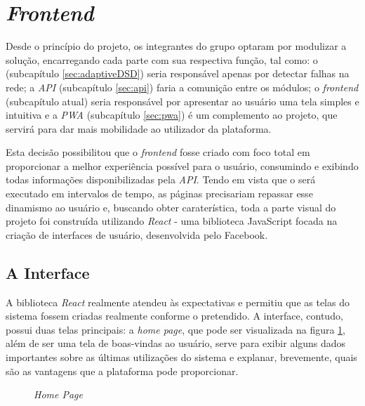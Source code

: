 \section{\textit{Frontend}}
\label{sec:frontend}

Desde o princípio do projeto, os integrantes do grupo optaram por modulizar a solução, encarregando cada parte com sua respectiva função, tal como: o \adaptive{} (subcapítulo \ref{sec:adaptiveDSD}) seria responsável apenas por detectar falhas na rede; a \textit{API} (subcapítulo \ref{sec:api}) faria a comunição entre os módulos; o \textit{frontend} (subcapítulo atual) seria responsável por apresentar ao usuário uma tela simples e intuitiva e a \textit{PWA} (subcapítulo \ref{sec:pwa}) é um complemento ao projeto, que servirá para dar mais mobilidade ao utilizador da plataforma.

Esta decisão possibilitou que o \textit{frontend} fosse criado com foco total em proporcionar a melhor experiência possível para o usuário, consumindo e exibindo todas informações disponibilizadas pela \textit{API}. Tendo em vista que o \adaptive{}será executado em intervalos de tempo, as páginas precisariam repassar esse dinamismo ao usuário e, buscando obter caraterística, toda a parte visual do projeto foi construída utilizando \textit{React} - uma biblioteca JavaScript focada na criação de interfaces de usuário, desenvolvida pelo Facebook.


\subsection{A Interface}
\label{sec:a_interface}

A biblioteca \textit{React} realmente atendeu às expectativas e permitiu que as telas do sistema fossem criadas realmente conforme o pretendido. A interface, contudo, possui duas telas principais: a \textit{home page}, que pode ser visualizada na figura \ref{fig:home_page}, além de ser uma tela de boas-vindas ao usuário, serve para exibir alguns dados importantes sobre as últimas utilizações do sistema e explanar, brevemente, quais são as vantagens que a plataforma pode proporcionar.

\begin{figure}[H]
    \centering
    \caption{\textit{Home Page}}
    \label{fig:home_page}
\end{figure}

